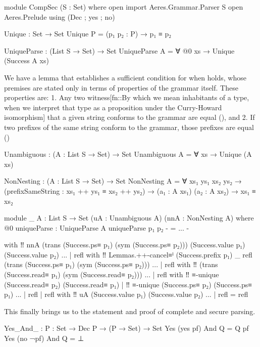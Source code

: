 \documentclass[11pt]{article}
\begin{document}
  \begin{AgdaAlign}
  \begin{code}[hide]
module CompSec (S : Set) where
  open import Aeres.Grammar.Parser S
  open Aeres.Prelude
    using (Dec ; yes ; no)
  \end{code}
  \begin{code}
  Unique : Set → Set
  Unique P = (p₁ p₂ : P) → p₁ ≡ p₂

  UniqueParse : (List S → Set) → Set
  UniqueParse A = ∀ {@0 xs} → Unique (Success A xs)
  \end{code}

  We have a lemma that establishes a sufficient condition for when
   holds, whose premises are stated only in terms of
  properties of the grammar itself.
  These properties are:
  1. Any two witness[fn::By which we mean inhabitants of a type, when we interpret that type as a proposition under the Curry-Howard isomorphism]
     that a given string conforms to the grammar are equal (), and
  2. If two prefixes of the same string conform to the grammar, those prefixes are equal ()


  \begin{code}
  Unambiguous : (A : List S → Set) → Set
  Unambiguous A = ∀ {xs} → Unique (A xs)

  NonNesting : (A : List S → Set) → Set
  NonNesting A =
    ∀ {xs₁ ys₁ xs₂ ys₂}
    → (prefixSameString : xs₁ ++ ys₁ ≡ xs₂ ++ ys₂)
    → (a₁ : A xs₁) (a₂ : A xs₂) → xs₁ ≡ xs₂

  module _ {A : List S → Set} (uA : Unambiguous A) (nnA : NonNesting A) where
    @0 uniqueParse : UniqueParse A
    uniqueParse p₁ p₂
    {- = ... -}
    \end{code}
    \begin{code}[hide]
      with ‼ nnA (trans (Success.ps≡ p₁) (sym (Success.ps≡ p₂))) (Success.value p₁) (Success.value p₂)
    ... | refl
      with ‼ Lemmas.++-cancel≡ˡ (Success.prefix p₁) _ refl (trans (Success.ps≡ p₁) (sym (Success.ps≡ p₂)))
    ... | refl
      with ‼ (trans (Success.read≡ p₁) (sym (Success.read≡ p₂)))
    ... | refl
      with ‼ ≡-unique (Success.read≡ p₂) (Success.read≡ p₁)
      |    ‼ ≡-unique (Success.ps≡ p₂) (Success.ps≡ p₁)
    ... | refl | refl
      with ‼ uA (Success.value p₁) (Success.value p₂)
    ... | refl = refl
  \end{code}

  This finally brings us to the statement and proof of complete and secure parsing.
  \begin{code}
  Yes_And_ : {P : Set} → Dec P → (P → Set) → Set
  Yes (yes pf) And Q = Q pf
  Yes (no ¬pf) And Q = ⊥


\end{code}
\end{AgdaAlign}
\end{document}
